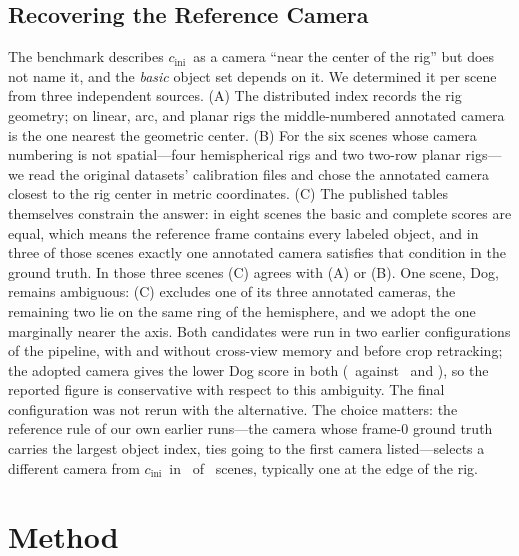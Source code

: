 \documentclass[journal]{IEEEtran}
\newcommand{\cini}{\ensuremath{c_{\mathrm{ini}}}}
\begin{document}
\subsection{Recovering the Reference Camera}
\label{sec:cini}
The benchmark describes \cini\ as a camera ``near the center of the rig'' but
does not name it, and the \emph{basic} object set depends on it. We determined
it per scene from three independent sources. (A) The distributed index records
the rig geometry; on linear, arc, and planar rigs the middle-numbered annotated
camera is the one nearest the geometric center. (B) For the six scenes whose camera numbering
is not spatial---four hemispherical rigs and two two-row planar rigs---we read
the original datasets' calibration files and chose the annotated camera closest
to the rig center in metric coordinates. (C) The published tables themselves
constrain the answer: in eight scenes the basic and complete scores are equal,
which means the reference frame contains every labeled object, and in three of
those scenes exactly one annotated camera satisfies that condition in the
ground truth. In those three scenes (C) agrees with (A) or (B). One scene, Dog,
remains ambiguous: (C) excludes one of its three annotated cameras, the
remaining two lie on the same ring of the hemisphere, and we adopt the one
marginally nearer the axis. Both candidates were run in two
earlier configurations of the pipeline, with and without cross-view memory and
before crop retracking; the adopted camera gives the lower Dog score in both
(\dogCini\ against \dogAltCiniA\ and \dogAltCiniB), so the reported figure is
conservative with respect to this ambiguity. The final configuration was not
rerun with the alternative. The choice matters: the reference rule of our own earlier
runs---the camera whose frame-0 ground truth carries the largest object index,
ties going to the first camera listed---selects a different camera from \cini\
in \nCiniMismatch\ of \nScenes\ scenes, typically one at the edge of the rig.

\section{Method}
\label{sec:method}
\end{document}
